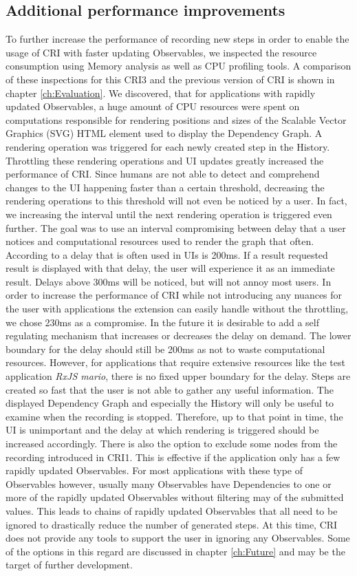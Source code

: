 \subsection{Additional performance improvements}
To further increase the performance of recording new steps in order to enable the usage of CRI with faster updating Observables, we inspected the resource consumption using Memory analysis as well as CPU profiling tools. A comparison of these inspections for this CRI3 and the previous version of CRI is shown in chapter \ref{ch:Evaluation}. We discovered, that for applications with rapidly updated Observables, a huge amount of CPU resources were spent on computations responsible for rendering positions and sizes of the Scalable Vector Graphics (SVG) HTML element used to display the Dependency Graph. A rendering operation was triggered for each newly created step in the History. Throttling these rendering operations and UI updates greatly increased the performance of CRI. Since humans are not able to detect and comprehend changes to the UI happening faster than a certain threshold, decreasing the rendering operations to this threshold will not even be noticed by a user. In fact, we increasing the interval until the next rendering operation is triggered even further. The goal was to use an interval compromising between delay that a user notices and computational resources used to render the graph that often. According to \cite{} a delay that is often used in UIs is 200ms. If a result requested result is displayed with that delay, the user will experience it as an immediate result. Delays above 300ms will be noticed, but will not annoy most users. In order to increase the performance of CRI while not introducing any nuances for the user with applications the extension can easily handle without the throttling, we chose 230ms as a compromise. In the future it is desirable to add a self regulating mechanism that increases or decreases the delay on demand. The lower boundary for the delay should still be 200ms as not to waste computational resources. However, for applications that require extensive resources like the test application \emph{RxJS mario}, there is no fixed upper boundary for the delay. Steps are created so fast that the user is not able to gather any useful information. The displayed Dependency Graph and especially the History will only be useful to examine when the recording is stopped. Therefore, up to that point in time, the UI is unimportant and the delay at which rendering is triggered should be increased accordingly.
There is also the option to exclude some nodes from the recording introduced in CRI1. This is effective if the application only has a few rapidly updated Observables. For most applications with these type of Observables however, usually many Observables have Dependencies to one or more of the rapidly updated Observables without filtering may of the submitted values. This leads to chains of rapidly updated Observables that all need to be ignored to drastically reduce the number of generated steps. At this time, CRI does not provide any tools to support the user in ignoring any Observables. Some of the options in this regard are discussed in chapter \ref{ch:Future} and may be the target of further development.

